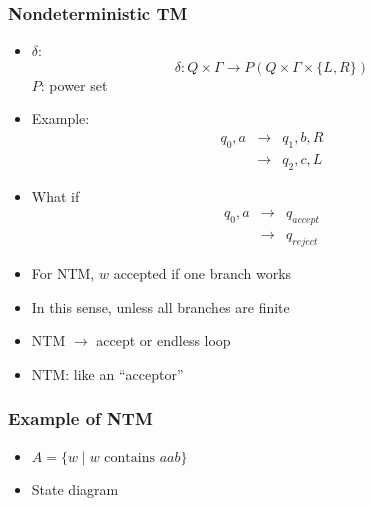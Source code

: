\begin{frame}[allowframebreaks] \frametitle{Nondeterministic TM}
  \begin{itemize}
\item $\delta$:
  \begin{equation*}
    \delta: Q\times \Gamma
\rightarrow P(Q\times \Gamma \times \{L,R\})
  \end{equation*}
$P$: power set

\item Example:
  \begin{eqnarray*}
    q_0,a & \rightarrow & q_1,b,R\\
& \rightarrow & q_2, c, L
  \end{eqnarray*}
\item What if 
  \begin{eqnarray*}
    q_0,a & \rightarrow & q_{accept} \\
& \rightarrow & q_{reject}
  \end{eqnarray*}

\item
  For NTM, $w$ accepted if one branch works

\item
  In this sense, unless all branches are finite

\item
  NTM $\rightarrow$ accept or endless loop

\item
  NTM: like an ``acceptor''

\end{itemize}\end{frame} \begin{frame}[allowframebreaks] \frametitle{Example of NTM}
  \begin{itemize}
\item 
$A = \{w\mid w\mbox{ contains } aab\}$
\item State diagram


\end{itemize}
\end{frame}
